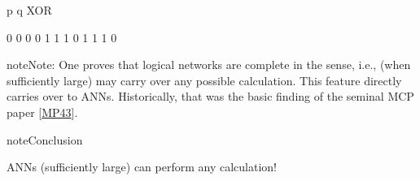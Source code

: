 \documentclass[letterpaper,10pt,english]{jupyterBook}
\begin{document}
\begin{sphinxVerbatim}[commandchars=\\\{\}]

   \PYG{p}{[}\PYG{p}{]} 
       \PYG{p}{[}\PYG{p}{]} 
\end{sphinxVerbatim}

\begin{sphinxVerbatim}[commandchars=\\\{\}]
p q XOR

0 0  0
0 1  1
1 0  1
1 1  0
\end{sphinxVerbatim}

\begin{sphinxadmonition}{note}{Note:}
\sphinxAtStartPar
One proves that logical networks are complete in the  sense, i.e., (when sufficiently large) may carry over any possible calculation. This feature directly carries over to ANNs. Historically, that was the basic finding of the seminal MCP paper {[}\hyperlink{cite.docs/conclusion:id9}{MP43}{]}.
\end{sphinxadmonition}

\begin{sphinxadmonition}{note}{Conclusion}

\sphinxAtStartPar
ANNs (sufficiently large) can perform any calculation!
\end{sphinxadmonition}
\end{document}
